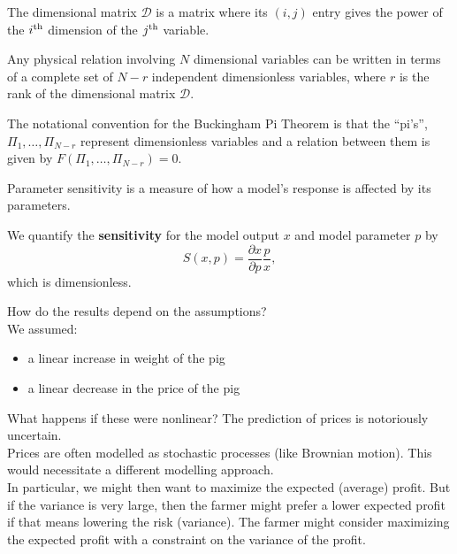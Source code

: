 \begin{SaveDefinition}[key=DimensionalMatrix, title={Dimensional Matrix}]
	The dimensional matrix $\mathcal{D}$ is a matrix where its $(i,j)$ entry gives the power of the $i^{\rm th}$ dimension of the $j^{\rm th}$ variable.
\end{SaveDefinition}

\begin{SaveDefinition}[key=BuckinghamPiThm, title={Buckingham Pi Theorem}]
	Any physical relation involving $N$ dimensional variables can be written in terms of a complete set of $N - r$ independent dimensionless variables, where $r$ is the rank of the dimensional matrix $\mathcal{D}$.
		
	The notational convention for the Buckingham Pi Theorem is that the ``pi's'', $\Pi_1,\ldots, \Pi_{N-r}$ represent dimensionless variables and a relation between them is given by $F(\Pi_1,\ldots,\Pi_{N-r}) = 0$.
\end{SaveDefinition}


\begin{SaveDefinition}[key=Sensitivity, title={Parameter Sensitivity}]

Parameter sensitivity is a measure of how a model's response is affected by its parameters.

We quantify the \textbf{sensitivity} for the model output $x$ and model parameter $p$ by
\[
S(x,p) = \frac{\partial x}{\partial p} \frac{p}{x},
\]
which is dimensionless.
\end{SaveDefinition}


\begin{SaveDefinition}[key=Robustness, title={Robustness}]

How do the results depend on the assumptions?\\

We assumed:
\begin{itemize}
	\item a linear increase in weight of the pig
	\item a linear decrease in the price of the pig	  \\
\end{itemize}

What happens if these were nonlinear? The prediction of prices is notoriously uncertain. \\

Prices are often modelled as stochastic processes (like Brownian motion). This would necessitate a different modelling approach.  \\

In particular, we might then want to maximize the expected (average) profit. But if the variance is very large, then the farmer might prefer a lower expected profit if that means lowering the risk (variance). 
The farmer might consider maximizing the expected profit with a constraint on the variance of the profit.
\end{SaveDefinition}



